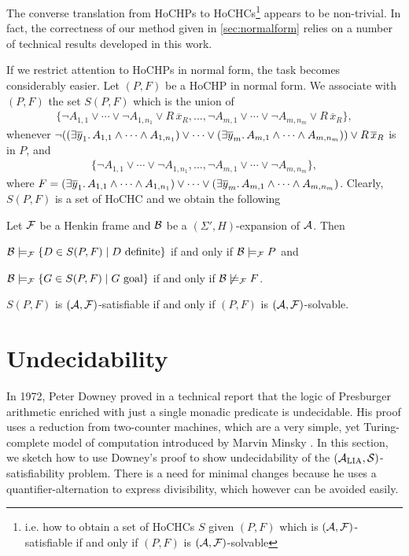 \documentclass[a4paper,twoside,notitlepage,openright,11pt]{report}
\begin{document}
The converse translation from HoCHPs to HoCHCs\footnote{i.e. how to obtain a set of HoCHCs $S$ given $(P,F)$ which is $(\mathcal A,\mathcal F)$-satisfiable if and only if $(P,F)$ is $(\mathcal A,\mathcal F)$-solvable} appears to be non-trivial. In fact, the correctness of our method given in \cref{sec:normalform} relies on a number of technical results developed in this work.

If we restrict attention to HoCHPs in normal form, the task becomes considerably easier. Let $(P,F)$ be a HoCHP in normal form. We associate with $(P,F)$ the set $S(P,F)$ which is the union of
\begin{align*}
  \{\neg A_{1,1}\lor\cdots\lor\neg A_{1,n_1}\lor R\,\overline x_R,\ldots,\neg A_{m,1}\lor\cdots\lor\neg A_{m,n_m}\lor R\,\overline x_R\},
\end{align*}
whenever $\neg((\exists\overline y_1\ldotp A_{1,1}\land\cdots\land A_{1,n_1})\lor\cdots\lor(\exists\overline y_m\ldotp A_{m,1}\land\cdots\land A_{m,n_m}))\lor R\,\overline x_R$ is in $P$, and
\begin{align*}
  \{\neg A_{1,1}\lor\cdots\lor\neg A_{1,n_1},\ldots,\neg A_{m,1}\lor\cdots\lor\neg A_{m,n_m}\},
\end{align*}
where $F=(\exists\overline y_1\ldotp A_{1,1}\land\cdots\land A_{1,n_1})\lor\cdots\lor(\exists\overline y_m\ldotp A_{m,1}\land\cdots\land A_{m,n_m})$. 
Clearly, $S(P,F)$ is a set of HoCHC and we obtain the following
\begin{lemma}
  Let $\mathcal F$ be a Henkin frame and $\mathcal B$ be a $(\Sigma',H)$-expansion of $\mathcal A$. Then
  \begin{thmlist}
  \item $\mathcal B\models_\mathcal F\{D\in S(P,F)\mid D\text{ definite}\}$ if and only if $\mathcal B\models_\mathcal F P$ and
  \item $\mathcal B\models_\mathcal F\{G\in S(P,F)\mid G\text{ goal}\}$ if and only if $\mathcal B\not\models_\mathcal F F$.
  \end{thmlist}
\end{lemma}
\begin{corollary}
  \label{cor:transprgmcl}
  $S(P,F)$ is $(\mathcal A,\mathcal F)$-satisfiable if and only if $(P,F)$ is $(\mathcal A,\mathcal F)$-solvable.
\end{corollary}


\section{Undecidability}
\label{sec:undec}
In 1972, Peter Downey proved in a technical report \cite{D72} that the logic of Presburger arithmetic enriched with just a single monadic predicate is undecidable. His proof uses a reduction from two-counter machines, which are a very simple, yet Turing-complete model of computation introduced by Marvin Minsky \cite{M67}. In this section, we sketch how to use Downey's proof to show undecidability of the $(\mathcal A_{\operatorname{LIA}},\mathcal S)$-satisfiability problem. There is a need for minimal changes because he uses a quantifier-alternation to express divisibility, which however can be avoided easily.
\end{document}
